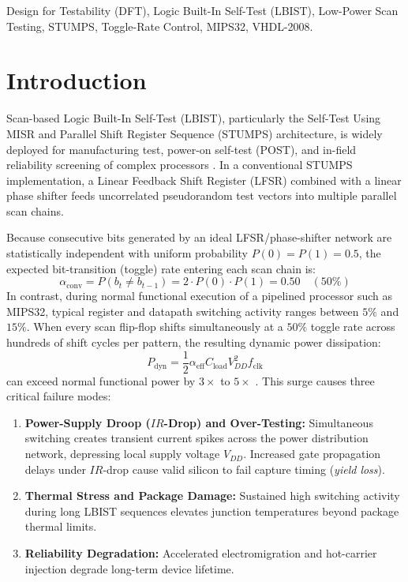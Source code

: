 \documentclass[conference]{IEEEtran}
\begin{document}
\begin{IEEEkeywords}
Design for Testability (DFT), Logic Built-In Self-Test (LBIST), Low-Power Scan Testing, STUMPS, Toggle-Rate Control, MIPS32, VHDL-2008.
\end{IEEEkeywords}


\section{Introduction}

Scan-based Logic Built-In Self-Test (LBIST), particularly the Self-Test Using MISR and Parallel Shift Register Sequence (STUMPS) architecture, is widely deployed for manufacturing test, power-on self-test (POST), and in-field reliability screening of complex processors \cite{bardell1987, wang2006}. In a conventional STUMPS implementation, a Linear Feedback Shift Register (LFSR) combined with a linear phase shifter feeds uncorrelated pseudorandom test vectors into multiple parallel scan chains.

Because consecutive bits generated by an ideal LFSR/phase-shifter network are statistically independent with uniform probability $P(0) = P(1) = 0.5$, the expected bit-transition (toggle) rate entering each scan chain is:
\begin{equation}
    \alpha_{\text{conv}} = P(b_t \neq b_{t-1}) = 2 \cdot P(0) \cdot P(1) = 0.50 \quad (50\%)
    \label{eq:conv_toggle}
\end{equation}
In contrast, during normal functional execution of a pipelined processor such as MIPS32, typical register and datapath switching activity ranges between $5\%$ and $15\%$. When every scan flip-flop shifts simultaneously at a $50\%$ toggle rate across hundreds of shift cycles per pattern, the resulting dynamic power dissipation:
\begin{equation}
    P_{\text{dyn}} = \frac{1}{2} \alpha_{\text{eff}} C_{\text{load}} V_{DD}^2 f_{\text{clk}}
    \label{eq:pdyn}
\end{equation}
can exceed normal functional power by $3\times$ to $5\times$ \cite{girard2002}. This surge causes three critical failure modes:
\begin{enumerate}
    \item \textbf{Power-Supply Droop ($IR$-Drop) and Over-Testing:} Simultaneous switching creates transient current spikes across the power distribution network, depressing local supply voltage $V_{DD}$. Increased gate propagation delays under $IR$-drop cause valid silicon to fail capture timing (\textit{yield loss}).
    \item \textbf{Thermal Stress and Package Damage:} Sustained high switching activity during long LBIST sequences elevates junction temperatures beyond package thermal limits.
    \item \textbf{Reliability Degradation:} Accelerated electromigration and hot-carrier injection degrade long-term device lifetime.
\end{enumerate}
\end{document}
